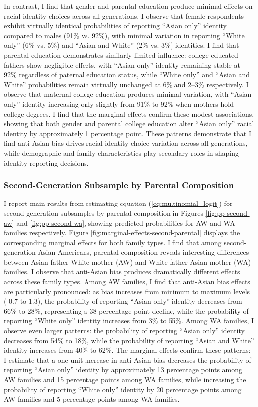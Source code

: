 In contrast, I find that gender and parental education produce minimal effects on racial identity choices across all generations. I observe that female respondents exhibit virtually identical probabilities of reporting ``Asian only'' identity compared to males (91\% vs. 92\%), with minimal variation in reporting ``White only'' (6\% vs. 5\%) and ``Asian and White'' (2\% vs. 3\%) identities. I find that parental education demonstrates similarly limited influence: college-educated fathers show negligible effects, with ``Asian only'' identity remaining stable at 92\% regardless of paternal education status, while ``White only'' and ``Asian and White'' probabilities remain virtually unchanged at 6\% and 2--3\% respectively. I observe that maternal college education produces minimal variation, with ``Asian only'' identity increasing only slightly from 91\% to 92\% when mothers hold college degrees. I find that the marginal effects confirm these modest associations, showing that both gender and parental college education alter ``Asian only'' racial identity by approximately 1 percentage point. These patterns demonstrate that I find anti-Asian bias drives racial identity choice variation across all generations, while demographic and family characteristics play secondary roles in shaping identity reporting decisions.

\subsubsection*{Second-Generation Subsample by Parental Composition}

I report main results from estimating equation (\ref{eq:multinomial_logit}) for second-generation subsamples by parental composition in Figures \ref{fig:pp-second-aw} and \ref{fig:pp-second-wa}, showing predicted probabilities for AW and WA families respectively. Figure \ref{fig:marginal-effects-second-parental} displays the corresponding marginal effects for both family types. I find that among second-generation Asian Americans, parental composition reveals interesting differences between Asian father-White mother (AW) and White father-Asian mother (WA) families. I observe that anti-Asian bias produces dramatically different effects across these family types. Among AW families, I find that anti-Asian bias effects are particularly pronounced: as bias increases from minimum to maximum levels (-0.7 to 1.3), the probability of reporting ``Asian only'' identity decreases from 66\% to 28\%, representing a 38 percentage point decline, while the probability of reporting ``White only'' identity increases from 3\% to 55\%. Among WA families, I observe even larger patterns: the probability of reporting ``Asian only'' identity decreases from 54\% to 18\%, while the probability of reporting ``Asian and White'' identity increases from 40\% to 62\%. The marginal effects confirm these patterns: I estimate that a one-unit increase in anti-Asian bias decreases the probability of reporting ``Asian only'' identity by approximately 13 percentage points among AW families and 15 percentage points among WA families, while increasing the probability of reporting ``White only'' identity by 20 percentage points among AW families and 5 percentage points among WA families.


